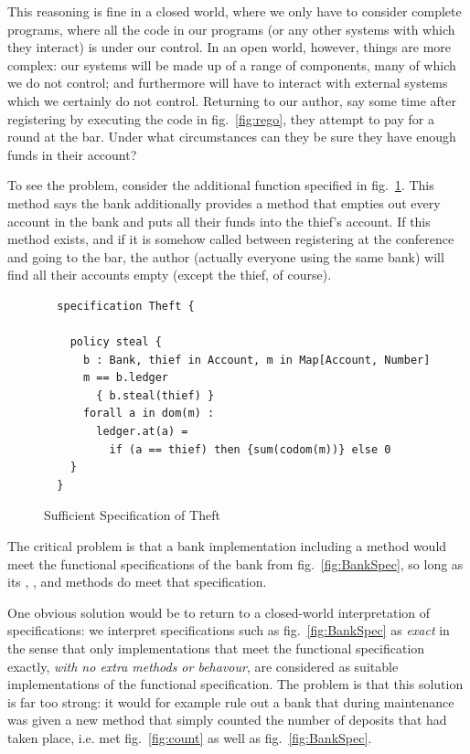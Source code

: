 
This reasoning is fine in a closed world, where we only have to
consider complete programs, where all the code in our programs (or any
other systems with which they interact) is under our control.   
In an
open world, however, things are more complex: our systems will be made
up of a range of components, many of which we do not control; and
furthermore will have to interact with external systems which we
certainly do not control.  Returning to our author, say some time
after registering by executing the code in fig.~\ref{fig:rego}, they
attempt to pay for a round at the bar.  Under what circumstances can
they be sure they have enough funds in their account?

To see the problem, consider the additional function specified in
fig.~\ref{fig:steal}. This method says the bank additionally provides a
 method that empties out every account in the bank and puts
all their funds into the thief's account. If this method exists, and
if it is somehow called between registering at the conference and
going to the bar, the author (actually everyone using the same bank)
will find all their accounts empty (except the thief, of course).

\begin{figure}[tbp]
\begin{lstlisting}
  specification Theft {

    policy steal {
      b : Bank, thief in Account, m in Map[Account, Number]
      m == b.ledger
        { b.steal(thief) }
      forall a in dom(m) :
        ledger.at(a) =
          if (a == thief) then {sum(codom(m))} else 0
    }
  }
\end{lstlisting}
\caption{Sufficient Specification of Theft}
\label{fig:steal}
\end{figure}

The critical problem is that a bank implementation including a 
method would meet the functional specifications of the bank from
fig.~\ref{fig:BankSpec}, so long as its ,
, and  methods do meet
that specification.

One obvious solution would be to return to a closed-world
interpretation of specifications: we interpret specifications such as
fig.~\ref{fig:BankSpec} as \emph{exact} in the sense that only
implementations that meet the functional specification exactly,
\emph{with no extra methods or behavour}, are considered as suitable
implementations of the functional specification. The problem is that
this solution is far too strong: it would for example rule out a bank
that  during maintenance was given a new method that simply counted the number of deposits that had taken place,
i.e. met fig.~\ref{fig:count} as well as fig.~\ref{fig:BankSpec}.

